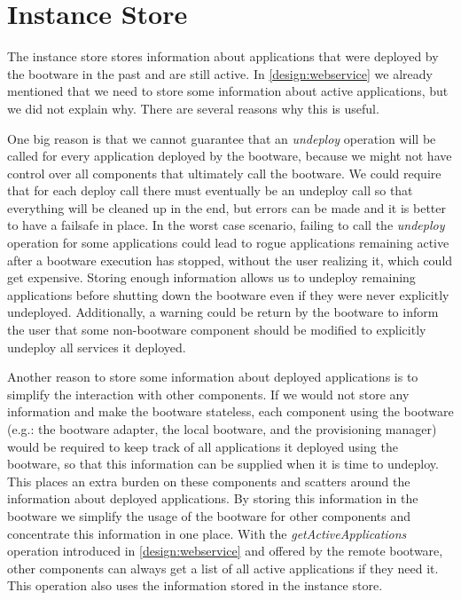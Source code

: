 \section{Instance Store}
\label{design:instancestore}

The instance store stores information about applications that were deployed by the bootware in the past and are still active.
In \autoref{design:webservice} we already mentioned that we need to store some information about active applications, but we did not explain why.
There are several reasons why this is useful.

One big reason is that we cannot guarantee that an \textit{undeploy} operation will be called for every application deployed by the bootware, because we might not have control over all components that ultimately call the bootware.
We could require that for each deploy call there must eventually be an undeploy call so that everything will be cleaned up in the end, but errors can be made and it is better to have a failsafe in place.
In the worst case scenario, failing to call the \textit{undeploy} operation for some applications could lead to rogue applications remaining active after a bootware execution has stopped, without the user realizing it, which could get expensive.
Storing enough information allows us to undeploy remaining applications before shutting down the bootware even if they were never explicitly undeployed.
Additionally, a warning could be return by the bootware to inform the user that some non-bootware component should be modified to explicitly undeploy all services it deployed.

Another reason to store some information about deployed applications is to simplify the interaction with other components.
If we would not store any information and make the bootware stateless, each component using the bootware (e.g.: the bootware adapter, the local bootware, and the provisioning manager) would be required to keep track of all applications it deployed using the bootware, so that this information can be supplied when it is time to undeploy.
This places an extra burden on these components and scatters around the information about deployed applications.
By storing this information in the bootware we simplify the usage of the bootware for other components and concentrate this information in one place.
With the \textit{getActiveApplications} operation introduced in \autoref{design:webservice} and offered by the remote bootware, other components can always get a list of all active applications if they need it.
This operation also uses the information stored in the instance store.

